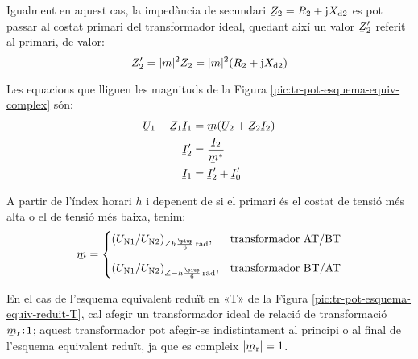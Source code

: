 \begin{center}
    
    \label{pic:tr-pot-esquema-equiv-complex}
\end{center}

Igualment en aquest cas, la impedància de secundari $\cmplx{Z}_2=R_2 + \ju X\ped{d2}$ es pot passar al costat primari del transformador ideal, quedant així un valor $\cmplx{Z}_2'$ referit al primari, de valor:
\begin{equation}
    \cmplx{Z}_2' = |\cmplx{m}|^2 \cmplx{Z}_2  = |\cmplx{m}|^2 (R_2 + \ju X\ped{d2})
\end{equation}

Les equacions que lliguen les magnituds de la Figura \vref{pic:tr-pot-esquema-equiv-complex} són:
\begin{subequations}
\begin{align}
    \cmplx{U}_1 - \cmplx{Z}_1 \cmplx{I}_1 &= \cmplx{m} ( \cmplx{U}_2  + \cmplx{Z}_2 \cmplx{I}_2 ) \\
    \cmplx{I}'_2 &= \frac{\cmplx{I}_2}{\cmplx{m}^*} \\
    \cmplx{I}_1  &=   \cmplx{I}_2' + \cmplx{I}_0'
\end{align}
\end{subequations}

A partir de l'índex horari $h$ i depenent de si el primari és el costat de tensió més alta o el de tensió més baixa, tenim:
\begin{equation}
\cmplx{m} = \begin{cases}
     (U\ped{N1}/U\ped{N2})_{\angle h \frac{\piup}{6}\si{\,rad}}, & \text{transformador AT/BT}\\[2.7ex]
     (U\ped{N1}/U\ped{N2})_{\angle -h \frac{\piup}{6}\si{\,rad}}, & \text{transformador BT/AT}
\end{cases}
\label{eq:rel-transf-cmplx}
\end{equation}

En el cas de l'esquema equivalent reduït en «T» de la Figura \vref{pic:tr-pot-esquema-equiv-reduit-T}, cal afegir un transformador ideal de relació de transformació  $\cmplx{m}\ped{r}\!:\!1$; aquest transformador pot afegir-se indistintament  al principi o al final de l'esquema equivalent reduït, ja que es compleix $|\cmplx{m}\ped{r}|=1$.

\begin{center}
    
    \label{fig:esq-reduit-T-complex}
\end{center}

